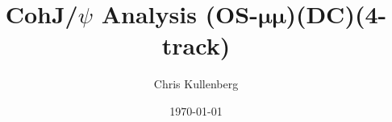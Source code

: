 \title{CohJ/$\psi$ Analysis (\textbf{OS}-$\boldsymbol{\mu\mu}$)(\textbf{DC})(\textbf{4-track})}
\author{Chris Kullenberg}
\date{\today}
